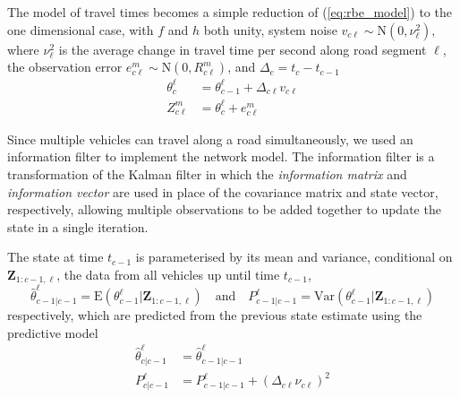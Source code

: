 The model of travel times becomes a simple reduction of (\ref{eq:rbe_model}) 
to the one dimensional case, 
with $f$ and $h$ both unity,
system noise $v_{c\ell} \sim \mathrm{N}(0, \nu_\ell^2)$,
where $\nu_\ell^2$ is the average change in travel time per second
along road segment $\ell$,
the observation error $e_{c\ell}^{m} \sim \mathrm{N}(0, R_{c\ell}^{m})$,
and $\Delta_c = t_c - t_{c-1}$
\begin{equation*}
\begin{split}
\theta_c^\ell &= \theta_{c-1}^\ell + \Delta_{c\ell} v_{c\ell} \\
Z_{c\ell}^{m} &= \theta_c^\ell + e_{c\ell}^{m}
\end{split}
\end{equation*}


Since multiple vehicles can travel along a road simultaneously,
we used an information filter to implement the network model.
The information filter is a transformation of the Kalman filter in which the
\emph{information matrix} and \emph{information vector} are used in place of 
the covariance matrix and state vector, respectively,
allowing multiple observations to be added together to update the state
in a single iteration.


The state at time $t_{c-1}$ is parameterised by its mean and variance,
conditional on $\boldsymbol{Z}_{1:c-1,\ell}$, 
the data from all vehicles up until time $t_{c-1}$,
\begin{equation*}
\hat \theta_{c-1|c-1}^\ell = 
\mathrm{E}(\theta_{c-1}^\ell | \boldsymbol{Z}_{1:c-1,\ell})
\quad\text{and}\quad
P_{c-1|c-1}^\ell = 
\mathrm{Var}(\theta_{c-1}^\ell | \boldsymbol{Z}_{1:c-1,\ell})
\end{equation*}
respectively,
which are predicted from the previous state estimate using the predictive model
\begin{align*}
\label{eq:kf_transition}
\hat \theta^\ell_{c|c-1} &= \hat \theta^\ell_{c-1|c-1} \\
P^\ell_{c|c-1} &= P^\ell_{c-1|c-1} + (\Delta_{c\ell} \nu_{c\ell})^2
\end{align*}

